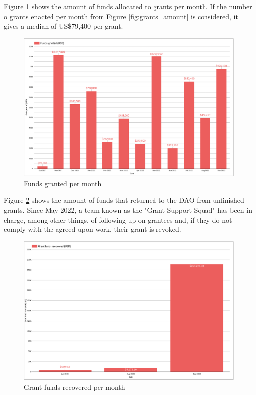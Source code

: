 \documentclass[MSE,Master,english]{twbook}%
\begin{document}
Figure \ref{fig:funds_granted} shows the amount of funds allocated to grants per month. If the number o grants enacted per month from Figure \ref{fig:grants_amount} is considered, it gives a median of US\$79,400 per grant.
\begin{figure}[H]
  \centering
  \includegraphics[width=\textwidth]{metrics/funds_granted.png}
  \caption{Funds granted per month}
  \label{fig:funds_granted}
\end{figure}

Figure \ref{fig:funds_recovered} shows the amount of funds that returned to the DAO from unfinished grants. Since May 2022, a team known as the "Grant Support Squad" has been in charge, among other things, of following up on grantees and, if they do not comply with the agreed-upon work, their grant is revoked.
\begin{figure}[H]
  \centering
  \includegraphics[width=\textwidth]{metrics/funds_recovered.png}
  \caption{Grant funds recovered per month}
  \label{fig:funds_recovered}
\end{figure}
\end{document}
